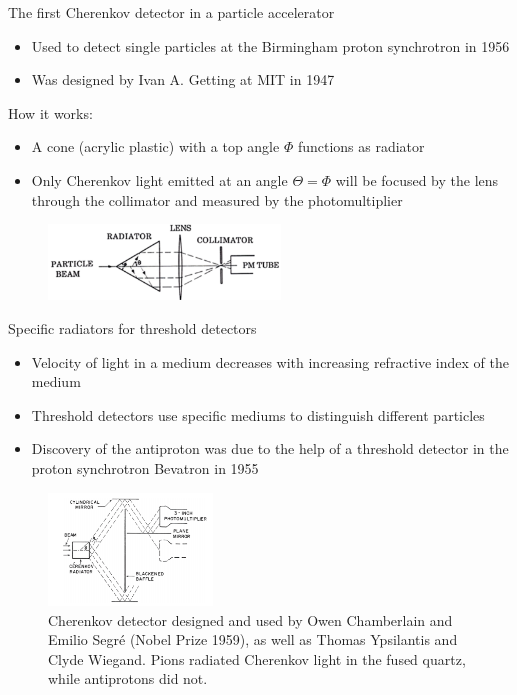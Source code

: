 \documentclass[aspectratio=1610, 10pt]{beamer}
\begin{document}
\begin{frame}{The first Cherenkov detector in a particle accelerator}
  \begin{itemize}
    \item Used to detect single particles at the Birmingham proton synchrotron in 1956
    \medskip
    \item Was designed by Ivan A. Getting at MIT in 1947
  \end{itemize}

How it works:
\begin{itemize}
  \item A cone (acrylic plastic) with a top angle $\Phi$ functions as radiator
  \medskip
  \item Only Cherenkov light emitted at an angle $\Theta = \Phi$ will be focused by the lens through the collimator and measured by the
  photomultiplier
\end{itemize}
\begin{figure}
  \includegraphics[width=0.55\textwidth]{images/the_second.png}
\end{figure}
\end{frame}

\begin{frame}{Specific radiators for threshold detectors}
  \begin{itemize}
    \item Velocity of light in a medium decreases with increasing refractive index of the medium
    \medskip
    \item Threshold detectors use specific mediums to distinguish different particles
    \medskip
    \item Discovery of the antiproton was due to the help of a threshold detector in the proton synchrotron Bevatron in 1955
  \end{itemize}
  \begin{figure}
    \includegraphics[width=0.39\textwidth]{images/proton.png}
    \caption{Cherenkov detector designed and used by Owen
     Chamberlain and Emilio Segré (Nobel Prize 1959), as well as Thomas Ypsilantis and Clyde Wiegand.
     Pions radiated Cherenkov light in the fused quartz, while antiprotons did not.}
  \end{figure}
\end{frame}
\end{document}
